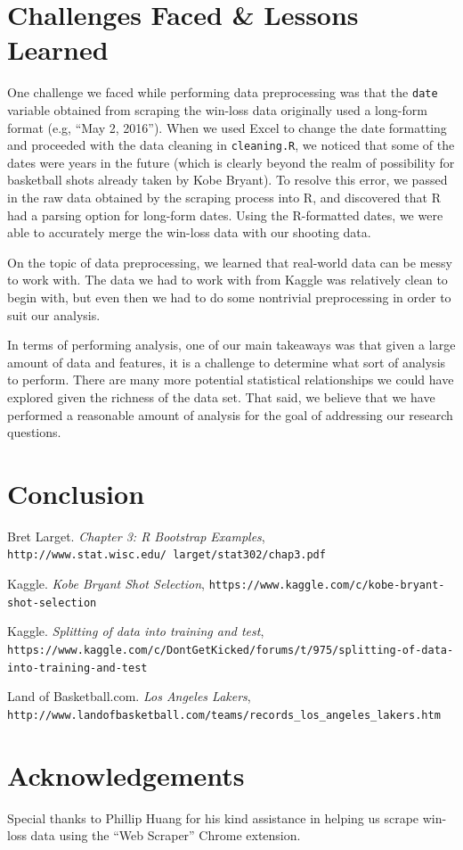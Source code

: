 \documentclass[paper=a4, fontsize=11pt]{scrartcl} %
\numberwithin{equation}{section} %
\numberwithin{figure}{section} %
\numberwithin{table}{section} %
\begin{document}
\section{Challenges Faced \& Lessons Learned}
\hspace*{1cm}One challenge we faced while performing data preprocessing was that the \texttt{date} variable obtained from scraping the win-loss data originally used a long-form format (e.g, ``May 2, 2016''). When we used Excel to change the date formatting and proceeded with the data cleaning in \texttt{cleaning.R}, we noticed that some of the dates were years in the future (which is clearly beyond the realm of possibility for basketball shots already taken by Kobe Bryant). To resolve this error, we passed in the raw data obtained by the scraping process into R, and discovered that R had a parsing option for long-form dates. Using the R-formatted dates, we were able to accurately merge the win-loss data with our shooting data. 

\hspace*{1cm}On the topic of data preprocessing, we learned that real-world data can be messy to work with. The data we had to work with from Kaggle was relatively clean to begin with, but even then we had to do some nontrivial preprocessing in order to suit our analysis.

\hspace*{1cm}In terms of performing analysis, one of our main takeaways was that given a large amount of data and features, it is a challenge to determine what sort of analysis to perform. There are many more potential statistical relationships we could have explored given the richness of the data set. That said, we believe that we have performed a reasonable amount of analysis for the goal of addressing our research questions.
\section{Conclusion}

\begin{thebibliography}{9}
	Bret Larget.
	\textit{Chapter 3: R Bootstrap Examples}, \\\texttt{http://www.stat.wisc.edu/~larget/stat302/chap3.pdf}
	
	Kaggle. 
	\textit{Kobe Bryant Shot Selection}, \texttt{https://www.kaggle.com/c/kobe-bryant-shot-selection}

	Kaggle. 
	\textit{Splitting of data into training and test},\\ \texttt{https://www.kaggle.com/c/DontGetKicked/forums/t/975/splitting-of-data-into-training-and-test}

	Land of Basketball.com.
	\textit{Los Angeles Lakers}, \\\texttt{http://www.landofbasketball.com/teams/records\_los\_angeles\_lakers.htm}
	


\end{thebibliography}
\section*{Acknowledgements}
\hspace*{1cm}Special thanks to Phillip Huang for his kind assistance in helping us scrape win-loss data using the ``Web Scraper'' Chrome extension.
\end{document}
